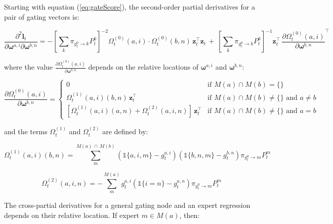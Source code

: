 \documentclass[12pt]{article}
\newcommand{\bw}[1]{\boldsymbol{\omega}^{#1}}
\newcommand{\gateprod}[2]{\pi_{#1 \longrightarrow #2}}
\newcommand{\FnOmegaNaught}[2]{\Omega^{(0)}_{t}( #1, #2 )}
\newcommand{\FnOmegaOne}[4]{\Omega^{(1)}_{t}(#1, #2)(#3, #4)}
\newcommand{\FnOmegaTwo}[3]{\Omega^{(2)}_{t}(#1, #2, #3)}
\theoremstyle{definition}
\begin{document}
\bigskip

Starting with equation (\ref{eq:gateScore}), the second-order partial derivatives for a pair of gating vectors is:

\begin{equation} \label{eq:nodehessian}
  \frac{\partial^{2} \boldsymbol{l}_{t}}{\partial \boldsymbol{\omega}^{a, i} \partial \boldsymbol{\omega}^{b,n}} = - \left[ \sum_{k} \gateprod{g^{0}_{t}}{k} P^{k}_{t} \right]^{-2} \FnOmegaNaught{a}{i} \cdot \FnOmegaNaught{b}{n} \, \boldsymbol{z}^{\top}_{t} \boldsymbol{z}_{t} \, + \, \left[ \sum_{k} \gateprod{g^{0}_{t}}{k} P^{k}_{t}\right]^{-1} \boldsymbol{z}^{\top}_{t} \, \frac{ \partial \FnOmegaNaught{a}{i} }{\partial \bw{b, n}}^{\top}
\end{equation}

where the value $\frac{ \partial \FnOmegaNaught{a}{i} }{\partial \bw{b, n}}$ depends on the relative locations of $\bw{a, i}$ and $\bw{b, n}$:

\begin{equation}
  \frac{ \partial \FnOmegaNaught{a}{i} }{\partial \boldsymbol{\omega}^{b, n}} = \begin{cases} 
       0 & \textrm{if $M(a) \cap M(b) = \{ \}$} \\
       \FnOmegaOne{a}{i}{b}{n}  \, \boldsymbol{z}_{t}^{\top} & \textrm{if $M(a) \cap M(b) \neq \{ \}$ and $a \neq b$} \\
       \left[ \FnOmegaOne{a}{i}{a}{n} + \FnOmegaTwo{a}{i}{n} \right] \, \boldsymbol{z}_{t}^{\top} & \textrm{if $M(a) \cap M(b) \neq \{ \}$ and $a = b$}
    \end{cases}
\end{equation}

and the terms $\Omega^{(1)}_{t}$ and $\Omega^{(2)}_{t}$ are defined by:

\begin{equation}
  \FnOmegaOne{a}{i}{b}{n} = \sum_{m}^{ M(a) \, \cap \, M(b) } \left( \mathbb{1}\{a, i, m\} - g^{a,i}_{t} \right) \left( \mathbb{1}\{b, n, m\} - g^{b,n}_{t} \right) \gateprod{g^{0}_{t}}{m} P^{m}_{t}
\end{equation}

\begin{equation}
  \FnOmegaTwo{a}{i}{n} = - \sum_{m}^{M(a)} g^{a, i}_{t} ( \mathbb{1}\{i = n\} - g^{a, n}_{t} ) \gateprod{g^{0}_{t}}{m} P^{m}_{t}
\end{equation}

The cross-partial derivatives for a general gating node and an expert regression depends on their relative location. If expert $m \in M(a)$, then:
\end{document}
